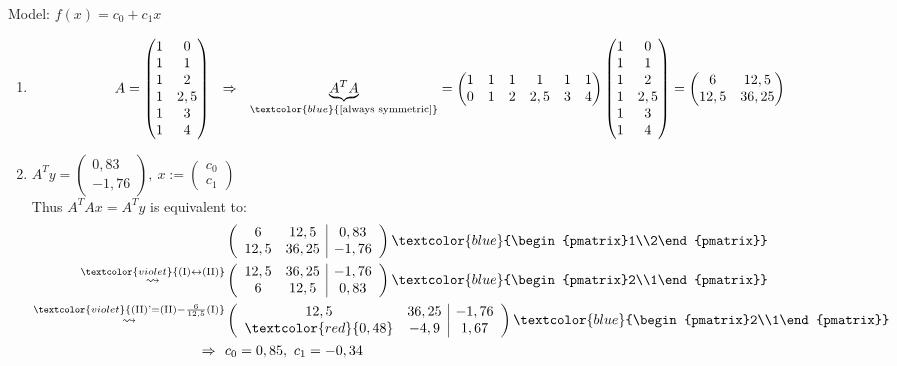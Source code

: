 Model: $f(x)=c_0 + c_1x$
\begin{enumerate}
	\item 
	$$
	A=\begin{pmatrix}1&0\\1&1\\1&2\\1&2,5\\1&3\\1&4\end{pmatrix}~~\Rightarrow~~
	\underbrace{A^TA}_{\textcolor{blue}{\text{[always symmetric]}}}=\begin{pmatrix}1&1&1&1&1&1\\0&1&2&2,5&3&4\end{pmatrix}\begin{pmatrix}1&0\\1&1\\1&2\\1&2,5\\1&3\\1&4\end{pmatrix}=\begin{pmatrix}6&12,5\\12,5&36,25\end{pmatrix}
	$$
	\item $A^Ty=\begin{pmatrix}0,83\\-1,76\end{pmatrix},~x:=\begin{pmatrix}c_0\\c_1\end{pmatrix}$\\
	Thus $A^TAx=A^Ty$ is equivalent to:
	\begin{align*}
	&\left(
	\begin{array}{cc|c}6&12,5&0,83\\12,5&36,25&-1,76\end{array}
	\right)
	\textcolor{blue}{\begin{pmatrix}1\\2\end{pmatrix}}\\
	\stackrel{\textcolor{violet}{\text{(I)}\leftrightarrow\text{(II)}}}{\rightsquigarrow}
	&\left(
	\begin{array}{cc|c}12,5&36,25&-1,76\\6&12,5&0,83\end{array}
	\right)
	\textcolor{blue}{\begin{pmatrix}2\\1\end{pmatrix}}\\
	\stackrel{\textcolor{violet}{\text{(II)'}=\text{(II)}-\frac{6}{12,5}\text{(I)}}}{\rightsquigarrow}
	&\left(
	\begin{array}{cc|c}12,5&36,25&-1,76\\\textcolor{red}{0,48}&-4,9&1,67\end{array}
	\right)
	\textcolor{blue}{\begin{pmatrix}2\\1\end{pmatrix}}\\
	\Rightarrow~~&c_0=0,85,~c_1=-0,34
	\end{align*}
\end{enumerate}